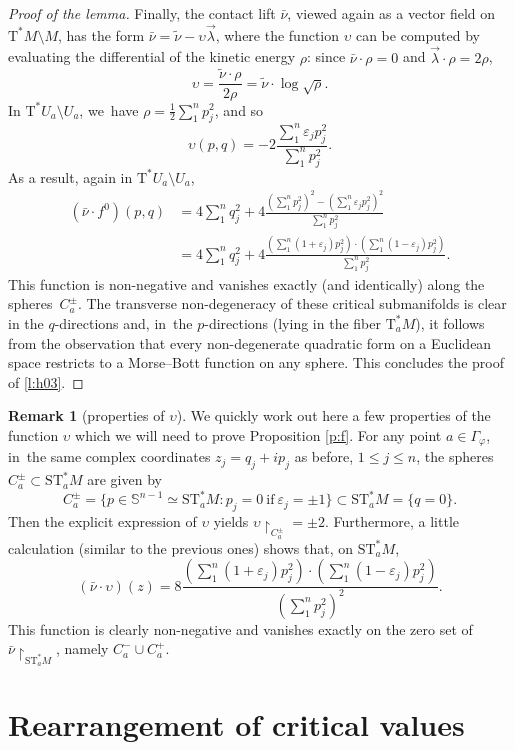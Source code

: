 \documentclass[10pt]{amsart}
\let\epsilon\varepsilon
\newcommand{\bS}{{\mathbb S}}
\newcommand{\Crit}{\Gamma_{\!\varphi}}
\newcommand{\sT}{\mathrm{T}^\ast}
\newcommand{\sST}{\mathrm{ST}^\ast}
\newcommand{\hnu}{\tilde\nu}
\newcommand{\cnu}{\bar\nu}
\newcommand{\rst}[1]{{\upharpoonright}_{\!#1}}
\newcommand{\lrp}[1]{\left(#1\right)}
\newcommand{\with}{\mathrel{:}}
\let\ups\upsilon
\let\sgn\epsilon
\theoremstyle{plain}
\theoremstyle{definition}
\newtheorem{remark}[theorem]{Remark}
\begin{document}
\begin{proof}[Proof of the lemma]
Finally, the contact lift $\cnu$, viewed again as a vector field on $\sT M \setminus M$,
has the form $\cnu = \hnu - \ups \vec\lambda$, where the function $\ups$ can be
computed by evaluating the differential of the kinetic energy $\rho$: since
$\cnu \cdot \rho = 0$ and $\vec\lambda \cdot \rho = 2\rho$,
\[
\ups = \frac{ \hnu \cdot \rho }{ 2\rho } = \hnu \cdot \log \sqrt\rho.
\]
In $\sT U_a\setminus U_a$, we~have $\rho = \frac12 \sum_1^n p_j^2$, and so
\[
\ups(p,q) = -2 \frac{ \sum_1^n \sgn_j p_j^2 }{ \sum_1^n p_j^2 }.
\]
As a result, again in $\sT U_a\setminus U_a$,
\begin{align*}
	(\cnu \cdot f^0) (p,q) &= 4 \sum_1^n q_j^2 + 4 \frac
	{ \lrp{ \sum_1^n p_j^2 }^2 - \lrp{ \sum_1^n \sgn_j p_j^2 }^2 }
 { \sum_1^n p_j^2 } \\
	&= 4 \sum_1^n q_j^2 + 4 \frac
 { \lrp{\sum_1^n (1+\sgn_j) p_j^2} \cdot \lrp{\sum_1^n (1-\sgn_j) p_j^2} }
 { \sum_1^n p_j^2 }.
\end{align*}
This function is non-negative and vanishes exactly (and identically) along the
spheres~$C_a^\pm$. The transverse non-degeneracy of these critical submanifolds
is clear in the $q$-directions and, in~the $p$-directions (lying in the fiber
$\sT_aM$), it follows from the observation that every non-degenerate quadratic
form on a Euclidean space restricts to a Morse--Bott function on any sphere.
This concludes the proof of \eqref{l:h03}.
\end{proof}

\begin{remark}[properties of $\ups$] \label{r:upsilon}
We quickly work out here a few properties of the function $\ups$ which we will
need to prove Proposition \ref{p:f}. For any point $a \in \Crit$, in~the same
complex coordinates $z_j = q_j+ip_j$ as before, $1 \le j \le n$, the spheres
$C_a^\pm \subset \sST_aM$ are given by
\[
C_a^\pm = \{p \in \bS^{n-1} \simeq \sST_aM \with
	p_j=0\ \text{if}\ \sgn_j = \pm1\} \subset \sST_aM = \{q=0\}.
\]
Then the explicit expression of $\ups$ yields $\ups \rst{ C_a^\pm } = \pm2$.
Furthermore, a little calculation (similar to the previous ones) shows that, on
$\sST_aM$,
\[
(\cnu \cdot \ups) (z) = 8 \frac
 { \lrp{\sum_1^n (1+\sgn_j) p_j^2} \cdot \lrp{\sum_1^n (1-\sgn_j) p_j^2} }
	{ \lrp{ \sum_1^n p_j^2 }^2 }.
\]
This function is clearly non-negative and vanishes exactly on the zero set of
$\cnu \rst{ \sST_aM }$, namely $C_a^- \cup C_a^+$.
\end{remark}

\section{Rearrangement of critical values}
\end{document}
